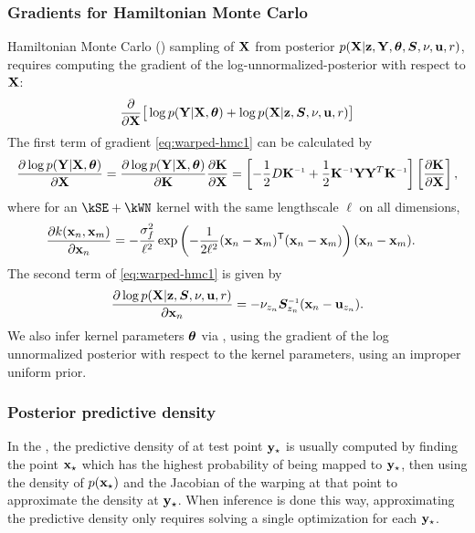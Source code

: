 \subsubsection{Gradients for Hamiltonian Monte Carlo}

Hamiltonian Monte Carlo (\HMC{}) sampling of $\mathbf{X}$ from posterior ${p(\mathbf{X}|{\bf{z}},\mathbf{Y},\bm{\theta},\bm{S},\nu,{\bf{u}},r)}$, requires computing the gradient of the log-unnormalized-posterior with respect to $\mathbf{X}$:
%
\begin{align}
\frac{\partial }{\partial \mathbf{X}} \big[ \log p(\mathbf{Y}|\mathbf{X},\bm{\theta}) + \log p(\mathbf{X}|{\bf{z}},\bm{S},\nu,{\bf{u}},r) \big]
\label{eq:warped-hmc1}
\end{align}
%
The first term of gradient \eqref{eq:warped-hmc1} can be calculated by
%
\begin{align}
\pderiv{\log p(\vY | \vX,\bm{\theta})}{\vX} =  \pderiv{\log p(\vY | \vX,\bm{\theta})}{\vK} \pderiv{\vK}{\vX} = \left[ -\frac{1}{2}D\vK\inv+\frac{1}{2}\vK\inv \vY \vY^{T} \vK\inv \right]\left[\pderiv{\vK}{\vX}\right],
\label{eq:warped-hmc2}
\end{align}
%
where for an $\kSE + \kWN$ kernel with the same lengthscale $\ell$ on all dimensions,
%
\begin{align}
\frac{\partial k({\bf{x}}_{n},{\bf{x}}_{m})}{\partial {\bf{x}}_n}
 & = -\frac{\sigma^2_f}{\ell^2} \exp \left( - \frac{1}{2 \ell^2} ({\bf{x}}_n - {\bf{x}}_m)^{\mathsf{T}} ({\bf{x}}_n - {\bf{x}}_m) \right) ({\bf{x}}_n - {\bf{x}}_m).
 \label{eq:warped-hmc3}
\end{align}
%
The second term of \eqref{eq:warped-hmc1} is given by
\begin{align}
\frac{\partial \log p(\vX|\CLAS,\bm{S},\nu,\vu,r)}{\partial \vx_{n}} 
= -\nu_{z_{n}}\bm{S}_{z_{n}}\inv(\vx_{n}-\vu_{z_{n}}).
\label{eq:warped-hmc4}
\end{align}
We also infer kernel parameters ${\boldsymbol{\theta}}$ via \HMC{}, using the gradient of the log unnormalized posterior with respect to the kernel parameters, using an improper uniform prior.




\subsubsection{Posterior predictive density}
\label{sec:iwmm-predictive-density}

In the \gplvm{}, the predictive density of at test point ${\bf{y}}_\star$ is usually computed by finding the point ${\bf{x}}_\star$ which has the highest probability of being mapped to ${\bf{y}}_\star$, then using the density of $p({\bf{x}}_\star)$ and the Jacobian of the warping at that point to approximate the density at ${\bf{y}}_\star$.
When inference is done this way, approximating the predictive density only requires solving a single optimization for each ${\bf{y}}_\star$.  

